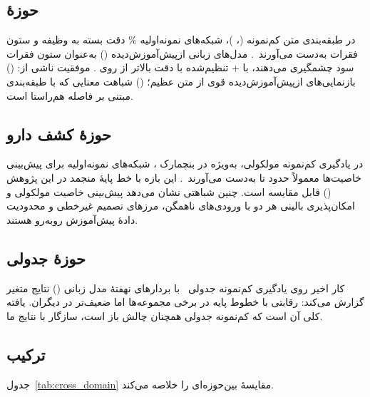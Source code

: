 \subsection{حوزۀ }

در طبقه‌بندی متن کم‌نمونه (، )، شبکه‌های نمونه‌اولیه \% دقت بسته به وظیفه و ستون فقرات به‌دست می‌آورند~\cite{han2018fewrel}. مدل‌های زبانی ازپیش‌آموزش‌دیده () به‌عنوان ستون فقرات سود چشمگیری می‌دهند، با + تنظیم‌شده با دقت بالاتر از \mbox{} روی . موفقیت ناشی از: () بازنمایی‌های ازپیش‌آموزش‌دیده قوی از متن عظیم؛ () شباهت معنایی که با طبقه‌بندی مبتنی بر فاصله هم‌راستا است.

\subsection{حوزۀ کشف دارو}

در یادگیری کم‌نمونه مولکولی، به‌ویژه در بنچمارک ، شبکه‌های نمونه‌اولیه برای پیش‌بینی خاصیت‌ها معمولاً  حدود  تا  به‌دست می‌آورند~\cite{stanley2021fs}. این بازه با خط پایۀ منجمد \texttt{} در این پژوهش () قابل مقایسه است. چنین شباهتی نشان می‌دهد پیش‌بینی خاصیت مولکولی و امکان‌پذیری بالینی هر دو با ورودی‌های ناهمگن، مرزهای تصمیم غیرخطی و محدودیت دادۀ پیش‌آموزش روبه‌رو هستند.

\subsection{حوزۀ جدولی}

کار اخیر روی یادگیری کم‌نمونه جدولی~\cite{hegselmann2023tabllm} با بردارهای نهفتۀ مدل زبانی () نتایج متغیر گزارش می‌کند: رقابتی با خطوط پایه در برخی مجموعه‌ها اما ضعیف‌تر در دیگران. یافته کلی آن است که کم‌نمونه جدولی همچنان چالش باز است، سازگار با نتایج ما.

\subsection{ترکیب}

جدول~\ref{tab:cross_domain} مقایسۀ بین‌حوزه‌ای را خلاصه می‌کند.

